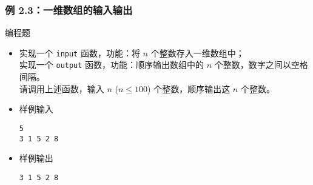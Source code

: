\begin{frame}[fragile]
    \frametitle{例 2.3：一维数组的输入输出}

     {
        


    } {
        \begin{exampleblock}{编程题}
            \begin{itemize}
                \item 实现一个 \lstinline|input| 函数，功能：将 $n$ 个整数存入一维数组中；\\
                    实现一个 \lstinline|output| 函数，功能：顺序输出数组中的 $n$ 个整数，数字之间以空格间隔。\\
                    请调用上述函数，输入 $n$ ($n \le 100$) 个整数，顺序输出这 $n$ 个整数。\\
                \item 样例输入

                    \lstinline|5|\\
                    \lstinline|3 1 5 2 8|

                \item 样例输出
                
                    \lstinline|3 1 5 2 8|

            \end{itemize}
        \end{exampleblock}
    }

\end{frame}

